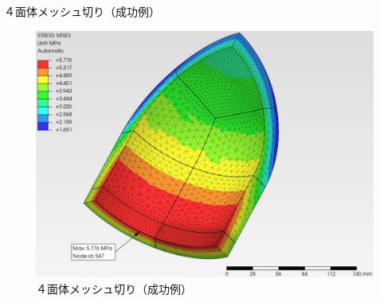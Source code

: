 \begin{frame}{４面体メッシュ切り（成功例）}
 
\begin{figure}[htbp]
\begin{center}
\includegraphics[keepaspectratio,scale=1.0]{work/images/fig01.jpg}
\caption{４面体メッシュ切り（成功例）}
\end{center}
\end{figure}
 
\end{frame}

